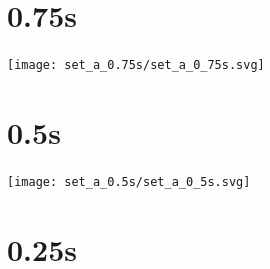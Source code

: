 \documentclass{article}
\begin{document}
\section{0.75s}
    \noindent\begin{minipage}{.45\textwidth}
    
    \end{minipage}\hfill
    \begin{minipage}{.45\textwidth}
    
    \end{minipage}
    
    \begin{center}
    \texttt{[image: set\_a\_0.75s/set\_a\_0\_75s.svg]}
    \end{center}
\clearpage

\section{0.5s}
    \noindent\begin{minipage}{.45\textwidth}
    
    \end{minipage}\hfill
    \begin{minipage}{.45\textwidth}
    
    \end{minipage}
    
    \begin{center}
    \texttt{[image: set\_a\_0.5s/set\_a\_0\_5s.svg]}
    \end{center}
\clearpage

\section{0.25s}
    \noindent\begin{minipage}{.45\textwidth}
    
    \end{minipage}\hfill
    \begin{minipage}{.45\textwidth}
    
    \end{minipage}
    
\end{document}
